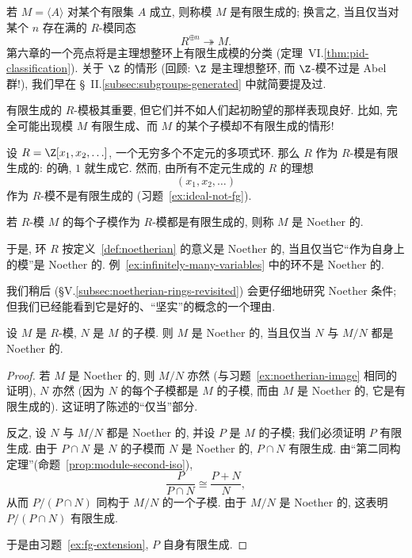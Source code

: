 若 $M = \langle A \rangle$ 对某个有限集 $A$ 成立, 则称模 $M$ 是有限生成的; 换言之, 当且仅当对某个 $n$ 存在满的 $R$-模同态
\[
R^{\oplus n} \twoheadrightarrow M.
\]
第六章的一个亮点将是主理想整环上有限生成模的分类 (定理~VI.\ref{thm:pid-classification}). 关于 $\Z$ 的情形 (回顾: $\Z$ 是主理想整环, 而 $\Z$-模不过是 Abel 群!), 我们早在 \S~II.\ref{subsec:subgroups-generated} 中就简要提及过.

有限生成的 $R$-模极其重要, 但它们并不如人们起初盼望的那样表现良好. 比如, 完全可能出现模 $M$ 有限生成、而 $M$ 的某个子模却不有限生成的情形!

\begin{example}
\label{ex:infinitely-many-variables}
设 $R = \Z[x_1, x_2, \ldots]$, 一个无穷多个不定元的多项式环. 那么 $R$ 作为 $R$-模是有限生成的: 的确, $1$ 就生成它. 然而, 由所有不定元生成的 $R$ 的理想
\[
(x_1, x_2, \ldots)
\]
作为 $R$-模不是有限生成的 (习题~\ref{ex:ideal-not-fg}).
\end{example}

\begin{definition}
\label{def:noetherian-module}
若 $R$-模 $M$ 的每个子模作为 $R$-模都是有限生成的, 则称 $M$ 是 Noether 的.
\end{definition}

于是, 环 $R$ 按定义~\ref{def:noetherian} 的意义是 Noether 的, 当且仅当它``作为自身上的模''是 Noether 的. 例~\ref{ex:infinitely-many-variables} 中的环不是 Noether 的.

我们稍后 (\S V.\ref{subsec:noetherian-rings-revisited}) 会更仔细地研究 Noether 条件; 但我们已经能看到它是好的、``坚实''的概念的一个理由.

\begin{proposition}
\label{prop:noetherian-extension}
设 $M$ 是 $R$-模, $N$ 是 $M$ 的子模. 则 $M$ 是 Noether 的, 当且仅当 $N$ 与 $M/N$ 都是 Noether 的.
\end{proposition}

\begin{proof}
若 $M$ 是 Noether 的, 则 $M/N$ 亦然 (与习题~\ref{ex:noetherian-image} 相同的证明), $N$ 亦然 (因为 $N$ 的每个子模都是 $M$ 的子模, 而由 $M$ 是 Noether 的, 它是有限生成的). 这证明了陈述的``仅当''部分.

反之, 设 $N$ 与 $M/N$ 都是 Noether 的, 并设 $P$ 是 $M$ 的子模; 我们必须证明 $P$ 有限生成. 由于 $P \cap N$ 是 $N$ 的子模而 $N$ 是 Noether 的, $P \cap N$ 有限生成. 由``第二同构定理''(命题~\ref{prop:module-second-iso}),
\[
\frac{P}{P \cap N} \cong \frac{P + N}{N},
\]
从而 $P/(P \cap N)$ 同构于 $M/N$ 的一个子模. 由于 $M/N$ 是 Noether 的, 这表明 $P/(P \cap N)$ 有限生成.

于是由习题~\ref{ex:fg-extension}, $P$ 自身有限生成.
\end{proof}


